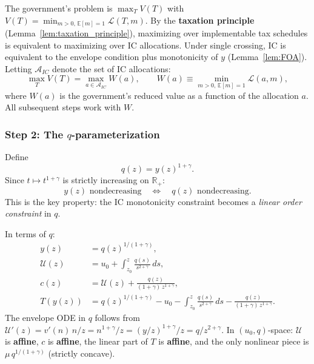 \documentclass[12pt,a4paper]{article}
\theoremstyle{definition}
\theoremstyle{plain}
\theoremstyle{remark}
\newcommand{\R}{\mathbb{R}}
\newcommand{\E}{\mathbb{E}}
\newcommand{\zlow}{z_{\scriptscriptstyle 0}}
\newcommand{\calU}{\mathcal{U}}
\newcommand{\calL}{\mathcal{L}}
\newcommand{\calA}{\mathcal{A}}
\begin{document}
The government's problem is $\max_T V(T)$ with
$V(T) = \min_{m>0,\,\E[m]=1}\calL(T,m)$.  By the
\textbf{taxation principle}
(Lemma~\ref{lem:taxation_principle}), maximizing over
implementable tax schedules is equivalent to maximizing
over IC allocations.  Under single crossing, IC is
equivalent to the envelope condition plus monotonicity
of $y$ (Lemma~\ref{lem:FOA}).  Letting $\calA_{IC}$
denote the set of IC allocations:
\begin{equation}
\label{eq:equivalence}
  \max_T V(T) = \max_{a \in \calA_{IC}} W(a),
  \qquad
  W(a) \equiv \min_{m>0,\,\E[m]=1}\calL(a,m),
\end{equation}
where $W(a)$ is the government's reduced value as a
function of the allocation $a$.  All subsequent steps
work with $W$.


\subsubsection{Step 2: The $q$-parameterization}

Define
\begin{equation}
\label{eq:q_def}
  q(z) = y(z)^{1+\gamma}.
\end{equation}
Since $t \mapsto t^{1+\gamma}$ is strictly increasing on
$\R_+$:
\begin{equation}
\label{eq:mono_equiv}
  y(z) \text{ nondecreasing}
  \quad\Longleftrightarrow\quad
  q(z) \text{ nondecreasing}.
\end{equation}
This is the key property: the IC monotonicity constraint
becomes a \emph{linear order constraint} in $q$.

In terms of $q$:
\begin{align}
  y(z) &= q(z)^{1/(1+\gamma)},
  \label{eq:q_to_y} \\[4pt]
  \calU(z) &= u_0 + \int_{\zlow}^z
  \frac{q(s)}{s^{2+\gamma}}\,ds,
  \label{eq:q_envelope} \\[4pt]
  c(z) &= \calU(z)
  + \frac{q(z)}{(1+\gamma)\,z^{1+\gamma}},
  \label{eq:q_consumption} \\[4pt]
  T(y(z)) &= q(z)^{1/(1+\gamma)}
  - u_0 - \int_{\zlow}^z \frac{q(s)}{s^{2+\gamma}}\,ds
  - \frac{q(z)}{(1+\gamma)\,z^{1+\gamma}}.
  \label{eq:q_tax}
\end{align}
The envelope ODE in $q$ follows from
$\calU'(z) = v'(n)\,n/z = n^{1+\gamma}/z
= (y/z)^{1+\gamma}/z = q/z^{2+\gamma}$.
In $(u_0, q)$-space: $\calU$ is \textbf{affine},
$c$ is \textbf{affine}, the linear part of $T$ is
\textbf{affine}, and the only nonlinear piece is
$\mu\,q^{1/(1+\gamma)}$ (strictly concave).
\end{document}
